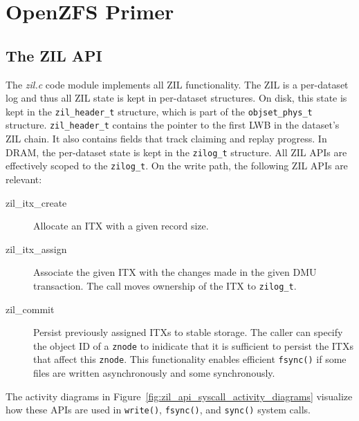 \documentclass[12pt,a4paper,twoside]{book}
\begin{document}
\section{OpenZFS Primer}

\subsection{The ZIL API}\label{openzfs:the_zil_api}
The \textit{zil.c} code module implements all ZIL functionality.
The ZIL is a per-dataset log and thus all ZIL state is kept in per-dataset structures.
On disk, this state is kept in the \lstinline{zil_header_t} structure, which is part of the \lstinline{objset_phys_t} structure.
\lstinline{zil_header_t} contains the pointer to the first LWB in the dataset's ZIL chain.
It also contains fields that track claiming and replay progress.
In DRAM, the per-dataset state is kept in the \lstinline{zilog_t} structure.
All ZIL APIs are effectively scoped to the \lstinline{zilog_t}. %
On the write path, the following ZIL APIs are relevant:
\begin{description}
    \item[zil\_itx\_create] Allocate an ITX with a given record size.
    \item[zil\_itx\_assign] Associate the given ITX with the changes made in the given DMU transaction.
          The call moves ownership of the ITX to \lstinline{zilog_t}.
    \item[zil\_commit] Persist previously assigned ITXs to stable storage.
          The caller can specify the object ID of a \lstinline{znode} to inidicate that it is sufficient to persist the ITXs that affect this \lstinline{znode}.
          This functionality enables efficient \lstinline{fsync()} if some files are written asynchronously and some synchronously.
\end{description}
The activity diagrams in Figure~\ref{fig:zil_api_syscall_activity_diagrams} visualize how these APIs are used in \lstinline{write()}, \lstinline{fsync()}, and \lstinline{sync()} system calls.
\end{document}
